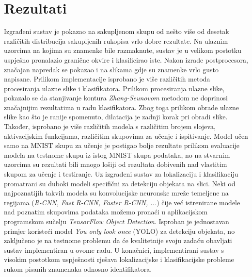 \documentclass[times, utf8, diplomski]{fer}
\theoremstyle{definition}
\begin{document}
\chapter{Rezultati}
Izgrađeni sustav je pokazao na sakupljenom skupu od nešto više od desetak različitih distribucija sakupljenih rukopisa vrlo dobre rezultate. Na ulaznim uzorcima na kojima su znamenke bile razmaknute, sustav je u velikom postotku uspješno pronalazio granične okvire i klasificirao iste. Nakon izrade postprocesora, značajan napredak se pokazao i na slikama gdje su znamenke vrlo gusto napisane.
Prilikom implementacije isprobano je više različitih metoda procesiranja ulazne slike i klasifikatora. Prilikom procesiranja ulazne slike, pokazalo se da stanjivanje kontura \textit{Zhang-Seunovom} metodom ne doprinosi značajnijim rezultatima u radu klasifikatora. Zbog toga prilikom obrade ulazne slike kao što je ranije spomenuto, dilatacija je zadnji korak pri obradi slike. Također, isprobano je više različitih modela s različitim brojem slojeva, aktivacijskim funkcijama, različitim skupovima za učenje i ispitivanje. Model učen samo na MNIST skupu za učenje je postigao bolje rezultate prilikom evaluacije modela na testnome skupu iz istog MNIST skupa podataka, no na stvarnim uzorcima su rezultati bili mnogo lošiji od rezultata dobivenih nad vlastitim skupom za učenje i testiranje. Uz izgrađeni sustav za lokalizaciju i klasifikaciju promatrani su duboki modeli specifični za detekciju objekata na slici. Neki od najpoznatijih takvih modela su konvolucijske neuronske mreže temeljene na regijama (\textit{R-CNN, Fast R-CNN, Faster R-CNN,  ...}) čije već istrenirane modele nad poznatim skupovima podataka možemo pronaći u  aplikacijskom programskom sučelju \textit{TensorFlow Object Detection}. Isproban je jednostavan primjer koristeći  model \textit{You only look once} (YOLO) za detekciju objekata, no zaključeno je na testnome problemu da će kvalitetnije svoju zadaću obavljati sustav implementiran u ovome radu. U konačnici, implementirani sustav s visokim postotkom uspješnosti rješava lokalizacijske i klasifikacijske probleme rukom pisanih znamenaka odnosno identifikatora.
\end{document}
